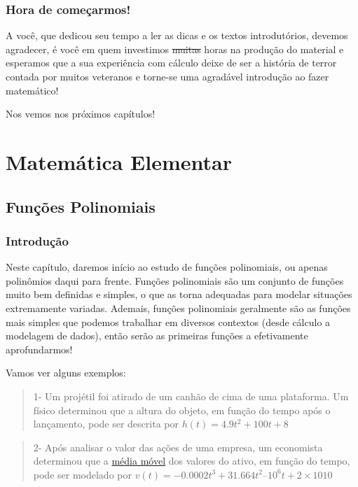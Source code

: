 \documentclass[
  portuguese,
  letterpaper,
  DIV=11,
  numbers=noendperiod]{scrreport}
\begin{document}
\section{Hora de começarmos!}\label{hora-de-comeuxe7armos}

A você, que dedicou seu tempo a ler as dicas e os textos introdutórios,
devemos agradecer, é você em quem investimos \st{muitas} horas na
produção do material e esperamos que a sua experiência com cálculo deixe
de ser a história de terror contada por muitos veteranos e torne-se uma
agradável introdução ao fazer matemático!

Nos vemos nos próximos capítulos! 🤩

\part{Matemática Elementar}

\chapter{Funções Polinomiais}\label{funuxe7uxf5es-polinomiais}

\section{Introdução}\label{introduuxe7uxe3o-1}

Neste capítulo, daremos início ao estudo de funções polinomiais, ou
apenas polinômios daqui para frente. Funções polinomiais são um conjunto
de funções muito bem definidas e simples, o que as torna adequadas para
modelar situações extremamente variadas. Ademais, funções polinomiais
geralmente são as funções mais simples que podemos trabalhar em diversos
contextos (desde cálculo a modelagem de dados), então serão as primeiras
funções a efetivamente aprofundarmos!

Vamos ver alguns exemplos:

\begin{quote}
1- Um projétil foi atirado de um canhão de cima de uma plataforma. Um
físico determinou que a altura do objeto, em função do tempo após o
lançamento, pode ser descrita por \(h(t) = 4.9t^2+100t+8\)
\end{quote}

\begin{quote}
2- Após analisar o valor das ações de uma empresa, um economista
determinou que a \href{https://pt.wikipedia.org/wiki/Média_móvel}{média
móvel} dos valores do ativo, em função do tempo, pode ser modelado por
\(v(t) = −0.0002t^3+31.664t^2–10^6t+2×1010\)
\end{quote}
\end{document}
